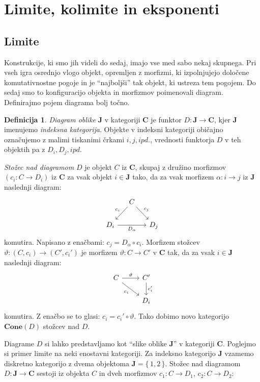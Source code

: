 \documentclass[12pt,a4paper]{book}
\theoremstyle{definition}
\newtheorem{definicija}{Definicija}[chapter]
\theoremstyle{plain}
\theoremstyle{definition}
\theoremstyle{remark}
\newcommand{\cat}[1]{\textbf{#1}}
\renewcommand{\set}[1]{\{\,#1\,\}}
\begin{document}
\section{Limite, kolimite in eksponenti}


\subsection{Limite}

Konstrukcije, ki smo jih videli do sedaj, imajo vse med sabo nekaj skupnega. Pri vseh igra osrednjo vlogo objekt, opremljen z morfizmi, ki izpolnjujejo določene komutativnostne pogoje in je "`najboljši"' tak objekt, ki ustreza tem pogojem. Do sedaj smo to konfiguracijo objekta in morfizmov poimenovali diagram. Definirajmo pojem diagrama bolj točno.

\begin{definicija}
\emph{Diagram oblike} $\cat{J}$ v kategoriji $\cat{C}$ je funktor $D : \cat{J} \to \cat{C}$, kjer $\cat{J}$ imenujemo \emph{indeksna kategorija}. Objekte v indeksni kategoriji običajno označujemo z malimi tiskanimi črkami $i,j, ipd.$, vrednosti funktorja $D$ v teh objektih pa z $D_i,D_j, ipd.$


\emph{Stožec nad diagramom} $D$ je objekt $C$ iz $\cat{C}$, skupaj z družino morfizmov $(c_i : C \to D_i)$ iz $\cat{C}$ za vsak objekt $i \in \cat{J}$ tako, da za vsak morfizem $\alpha : i \to j$ iz $\cat{J}$ naslednji diagram:
%
$$\begin{tikzcd}[column sep=small]
& C \ar[dl, "c_i"'] \ar[dr, "c_j"] & \\
D_i \ar[rr, "D_\alpha"'] & & D_j
\end{tikzcd}$$
%
komutira. Napisano z enačbami: $c_j = D_\alpha \circ c_i.$
%
Morfizem stožcev $\vartheta : (C, c_i) \to (C', c_i')$ je morfizem $\vartheta : C \to C'$ v $\cat{C}$ tak, da za vsak $i \in \cat{J}$ naslednji diagram:
%
$$\begin{tikzcd}
C \ar[dr, "c_i"'] \ar[r, "\vartheta"] & C' \ar[d, "c_i'"] \\
& D_i
\end{tikzcd}$$
%
komutira. Z enačbo se to glasi: $c_i = c_i' \circ \vartheta$.
%
Tako dobimo novo kategorijo $\cat{Cone}(D)$ stožcev nad $D$.
\end{definicija}
%
Diagrame $D$ si lahko predstavljamo kot "`slike oblike $\cat{J}$"' v kategoriji $\cat{C}$. Poglejmo si primer limite na neki enostavni kategoriji. Za indeksno kategorijo $\cat{J}$ vzamemo diskretno kategorijo z dvema objektoma $\cat{J} = \set{1,2}$. Stožec nad diagramom $D : \cat{J} \to \cat{C}$ sestoji iz objekta $C$ in dveh morfizmov $c_1 : C \to D_1$, $c_2 : C \to D_2$:
\end{document}
